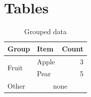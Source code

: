 \documentclass{article}
\begin{document}
\section{Tables}
\begin{table}
\caption{Grouped data}
\begin{tabular}{llr}
\toprule
Group & Item & Count \\
\midrule
\multirow{2}{*}{Fruit} & Apple & 3 \\
 & Pear & 5 \\
Other & \multicolumn{2}{c}{none} \\
\bottomrule
\end{tabular}
\end{table}
\end{document}
